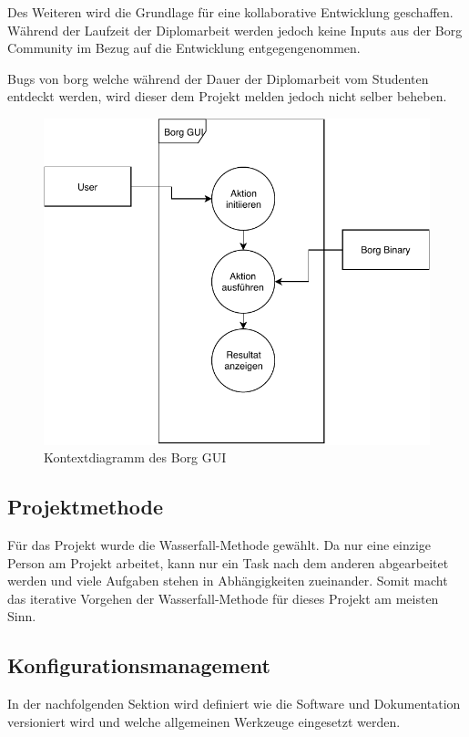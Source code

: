 Des Weiteren wird die Grundlage für eine kollaborative Entwicklung geschaffen.
Während der Laufzeit der Diplomarbeit werden jedoch keine Inputs aus der Borg
Community im Bezug auf die Entwicklung entgegengenommen.

Bugs von \gls{borg} welche während der Dauer der Diplomarbeit vom Studenten
entdeckt werden, wird dieser dem Projekt melden jedoch nicht selber beheben.

\begin{figure}[htbp]
\centering
\includegraphics[width=.9\linewidth]{pictures/kontextdiagramm.pdf}
\caption{\label{fig:org9f2696c}
Kontextdiagramm des Borg GUI}
\end{figure}

\subsection{Projektmethode}
\label{sec:orga79d291}

Für das Projekt wurde die Wasserfall-Methode gewählt. Da nur eine
einzige Person am Projekt arbeitet, kann nur ein Task nach dem anderen
abgearbeitet werden und viele Aufgaben stehen in Abhängigkeiten zueinander.
Somit macht das iterative Vorgehen der Wasserfall-Methode für dieses Projekt am
meisten Sinn.

\subsection{Konfigurationsmanagement}
\label{sec:org9479973}

In der nachfolgenden Sektion wird definiert wie die Software und Dokumentation
versioniert wird und welche allgemeinen Werkzeuge eingesetzt werden.

